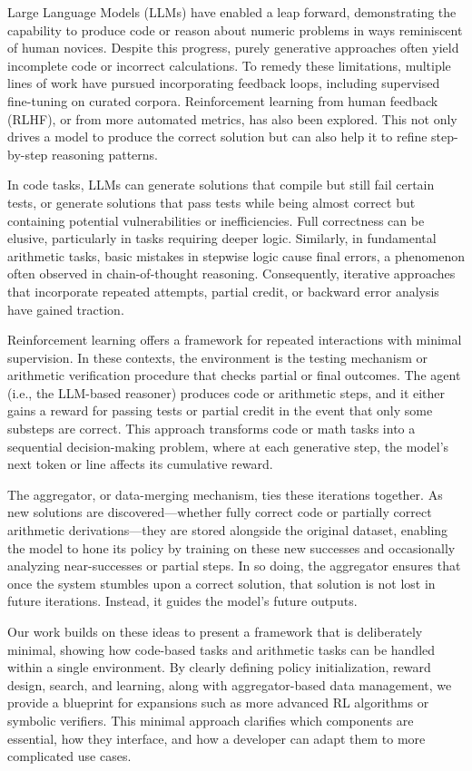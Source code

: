 \documentclass{article}
\begin{document}
Large Language Models (LLMs) have enabled a leap forward, demonstrating the capability to produce code or reason about numeric problems in ways reminiscent of human novices. Despite this progress, purely generative approaches often yield incomplete code or incorrect calculations. To remedy these limitations, multiple lines of work have pursued incorporating feedback loops, including supervised fine-tuning on curated corpora. Reinforcement learning from human feedback (RLHF), or from more automated metrics, has also been explored. This not only drives a model to produce the correct solution but can also help it to refine step-by-step reasoning patterns.

In code tasks, LLMs can generate solutions that compile but still fail certain tests, or generate solutions that pass tests while being almost correct but containing potential vulnerabilities or inefficiencies. Full correctness can be elusive, particularly in tasks requiring deeper logic. Similarly, in fundamental arithmetic tasks, basic mistakes in stepwise logic cause final errors, a phenomenon often observed in chain-of-thought reasoning. Consequently, iterative approaches that incorporate repeated attempts, partial credit, or backward error analysis have gained traction.

Reinforcement learning offers a framework for repeated interactions with minimal supervision. In these contexts, the environment is the testing mechanism or arithmetic verification procedure that checks partial or final outcomes. The agent (i.e., the LLM-based reasoner) produces code or arithmetic steps, and it either gains a reward for passing tests or partial credit in the event that only some substeps are correct. This approach transforms code or math tasks into a sequential decision-making problem, where at each generative step, the model’s next token or line affects its cumulative reward.

The aggregator, or data-merging mechanism, ties these iterations together. As new solutions are discovered—whether fully correct code or partially correct arithmetic derivations—they are stored alongside the original dataset, enabling the model to hone its policy by training on these new successes and occasionally analyzing near-successes or partial steps. In so doing, the aggregator ensures that once the system stumbles upon a correct solution, that solution is not lost in future iterations. Instead, it guides the model’s future outputs.

Our work builds on these ideas to present a framework that is deliberately minimal, showing how code-based tasks and arithmetic tasks can be handled within a single environment. By clearly defining policy initialization, reward design, search, and learning, along with aggregator-based data management, we provide a blueprint for expansions such as more advanced RL algorithms or symbolic verifiers. This minimal approach clarifies which components are essential, how they interface, and how a developer can adapt them to more complicated use cases.
\end{document}
